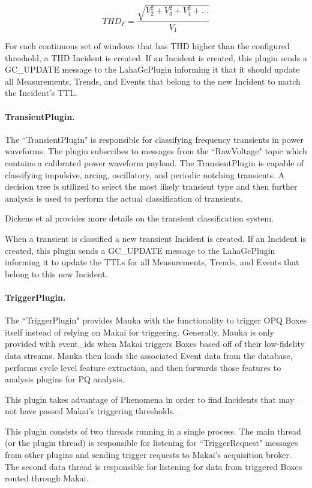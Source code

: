 \begin{equation}
\label{equation:Thd}
	THD_F = \frac{\sqrt{V_2^2 + V_3^2 + V_4^2 + \dots}}{V_1}
\end{equation}

For each continuous set of windows that has THD higher than the configured threshold, a THD Incident is created. If an Incident is created, this plugin sends a GC\_UPDATE message to the LahaGcPlugin informing it that it should update all Measurements, Trends, and Events that belong to the new Incident to match the Incident's TTL\@.


\paragraph{TransientPlugin.}
The ``TransientPlugin" is responsible for classifying frequency transients in power waveforms. The plugin subscribes to messages from the ``RawVoltage" topic which contains a calibrated power waveform payload. The TransientPlugin is capable of classifying impulsive, arcing, oscillatory, and periodic notching transients. A decision tree is utilized to select the most likely transient type and then further analysis is used to perform the actual classification of transients.

Dickens et al\cite{csdl2-19-02} provides more details on the transient classification system.

When a transient is classified a new transient Incident is created. If an Incident is created, this plugin sends a GC\_UPDATE message to the LahaGcPlugin informing it to update the TTLs for all Measurements, Trends, and Events that belong to this new Incident.

\paragraph{TriggerPlugin.}\label{sec:trigger_plugin}
The ``TriggerPlugin" provides Mauka with the functionality to trigger OPQ Boxes itself instead of relying on Makai for triggering. Generally, Mauka is only provided with event\_ids when Makai triggers Boxes based off of their low-fidelity data streams. Mauka then loads the associated Event data from the database, performs cycle level feature extraction, and then forwards those features to analysis plugins for PQ analysis.

This plugin takes advantage of Phenomena in order to find Incidents that may not have passed Makai's triggering thresholds.

This plugin consists of two threads running in a single process. The main thread (or the plugin thread) is responsible for listening for ``TriggerRequest" messages from other plugins and sending trigger requests to Makai's acquisition broker. The second data thread is responsible for listening for data from triggered Boxes routed through Makai.

